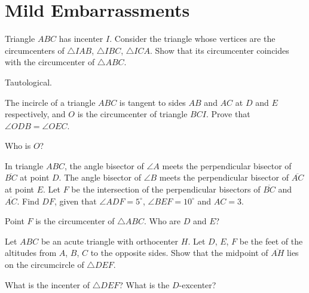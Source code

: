 \documentclass[11pt]{scrartcl}
\begin{document}
\section{Mild Embarrassments}
\begin{problem}
	[USAMO 1988] Triangle $ABC$ has incenter $I$.
	Consider the triangle whose vertices are the circumcenters of $\triangle IAB$, $\triangle IBC$, $\triangle ICA$.
	Show that its circumcenter coincides with the circumcenter of $\triangle ABC$.
	\begin{hint}
		Tautological.
	\end{hint}
\end{problem}
\begin{problem}
	[CGMO 2012] The incircle of a triangle $ABC$ is tangent to sides $AB$ and $AC$ at $D$ and $E$ respectively, and $O$ is the circumcenter of triangle $BCI$. Prove that $\angle ODB = \angle OEC$.
	\begin{hint}
		Who is $O$?
	\end{hint}
\end{problem}
\begin{problem}
	 In triangle $ABC$, the angle bisector of $\angle A$
	meets the perpendicular bisector of $\overline{BC}$ at point $D$.
	The angle bisector of $\angle B$ meets the perpendicular bisector
	of $\overline{AC}$ at point $E$.
	Let $F$ be the intersection of the perpendicular bisectors of $\overline{BC}$ and $\overline{AC}$.
	Find $DF$, given that $\angle ADF = 5^{\circ}$,
	$\angle BEF = 10^{\circ}$ and $AC = 3$.
	\begin{hint}
		Point $F$ is the circumcenter of $\triangle ABC$.
		Who are $D$ and $E$?
	\end{hint}
\end{problem}
\begin{problem}
	Let $ABC$ be an acute triangle with orthocenter $H$.
	Let $D$, $E$, $F$ be the feet of the altitudes from $A$, $B$, $C$ to the opposite sides.
	Show that the midpoint of $\overline{AH}$ lies on the circumcircle of $\triangle DEF$.
	\begin{hint}
		What is the incenter of $\triangle DEF$?
		What is the $D$-excenter?
	\end{hint}
\end{problem}
\end{document}
